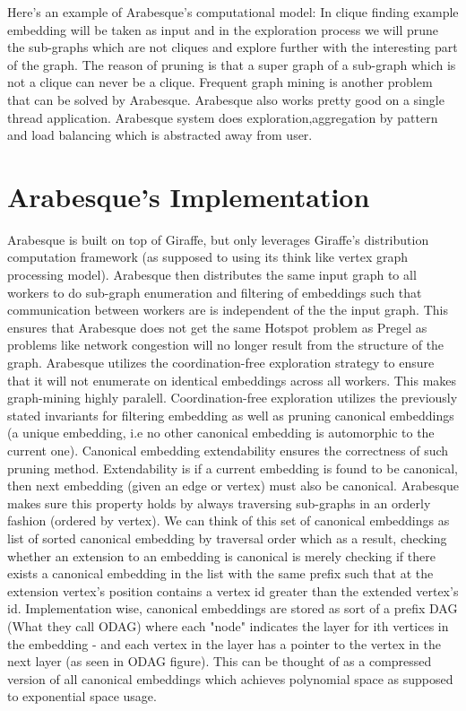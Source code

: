 \documentclass[twoside]{article}
\begin{document}
Here's an example of Arabesque's computational model: In clique finding example embedding will be taken as input and in the exploration process we will prune the sub-graphs which are not cliques and explore further with the interesting part of the graph. The reason of pruning is that a super graph of a sub-graph which is not a clique can never be a clique. Frequent graph mining is another problem that can be solved by Arabesque. Arabesque also works pretty good on a single thread application. Arabesque system does exploration,aggregation by pattern and load balancing which is abstracted away from user. 
  
\section{Arabesque's Implementation}

Arabesque is built on top of Giraffe, but only leverages Giraffe's distribution computation framework (as supposed to using its think like vertex graph processing model). Arabesque then distributes the same input graph to all workers to do sub-graph enumeration and filtering of embeddings such that communication between workers are is independent of the the input graph. This ensures that Arabesque does not get the same Hotspot problem as Pregel as problems like network congestion will no longer result from the structure of the graph. Arabesque utilizes the coordination-free exploration strategy to ensure that it will not enumerate on identical embeddings across all workers. This makes graph-mining highly paralell. Coordination-free exploration utilizes the previously stated invariants for filtering embedding as well as pruning canonical embeddings (a unique embedding, i.e no other canonical embedding is automorphic to the current one). Canonical embedding extendability ensures the correctness of such pruning method. Extendability is if a current embedding is found to be canonical, then next embedding (given an edge or vertex) must also be canonical. Arabesque makes sure this property holds by always traversing sub-graphs in an orderly fashion (ordered by vertex). We can think of this set of canonical embeddings as list of sorted canonical embedding by traversal order which as a result, checking whether an extension to an embedding is canonical is merely checking if there exists a canonical embedding in the list with the same prefix such that at the extension vertex's position contains a vertex id greater than the extended vertex's id. Implementation wise, canonical embeddings are stored as sort of a prefix DAG (What they call ODAG) where each "node" indicates the layer for ith vertices in the embedding - and each vertex in the layer has a pointer to the vertex in the next layer (as seen in  ODAG figure). This can be thought of as a compressed version of all canonical embeddings which achieves polynomial space as supposed to exponential space usage. 
\end{document}
